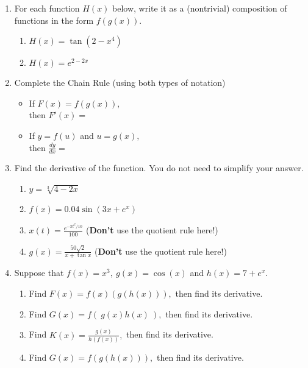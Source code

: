\documentclass[11pt,fleqn]{article}
\begin{document}
\setlength{\parindent}{0cm}
\renewcommand{\headrulewidth}{0pt}
\newcommand{\blank}[1]{\rule{#1}{0.75pt}}
\renewcommand{\d}{\displaystyle}
\vspace*{-0.7in}
\begin{center}
 {\large{ }}
\end{center}
\begin{enumerate}
\item For each function $H(x)$ below, write it as a (nontrivial) composition of functions in the form $f(g(x)).$
	\begin{multicols}{2}
	\begin{enumerate}
	\item $H(x)=\tan ( 2-x^4)$
	\item $H(x)=e^{2-2x}$
	\end{enumerate}
	\end{multicols}
\vspace{1in}
\item Complete the Chain Rule (using both types of notation)
	\begin{multicols}{2}
	\begin{itemize}
	\item If $F(x)=f(g(x)),$\\ 
	
	then $F'(x)=$\\
	
	\item If $y=f(u)$ and $u=g(x),$\\ 
	
	then $\frac{dy}{dx}=$\\
	\end{itemize}
	\end{multicols}
\item Find the derivative of the function. You do not need to simplify your answer.
	\begin{enumerate}
	\item $\d{y=\sqrt[3]{4-2x}}$
	\vfill
	\item $\d{f(x)=0.04 \sin(3x+e^x)}$
	\vfill
	\newpage
	\item $\d{x(t)=\frac{e^{-\pi t^2/10}}{100}}$  (\textbf{Don't} use the quotient rule here!)
\vfill
	
	\item $\d{g(x)=\frac{50\sqrt{2}}{x+\tan x}}$ (\textbf{Don't} use the quotient rule here!)
	\vfill
	\end{enumerate}
\item Suppose that $f(x)=x^3,\: g(x)=\cos(x)$ and $h(x)=7+e^x.$
	\begin{enumerate}
	\item Find $\d{F(x)=f(x) \left( g(h(x)) \right),}$ then find its derivative.	
	\vfill
	\item Find $\d{G(x)=f(\:g(x) h(x)\:),}$ then find its derivative.
	\vfill
	\newpage
	\item Find $\d{K(x)=\frac{g(x)}{h(f(x))},}$ then find its derivative.
	\vfill
	\item Find $\d{G(x)=f(g( h(x))),}$ then find its derivative.
	\vfill
	\end{enumerate}
\end{enumerate}
\end{document}
